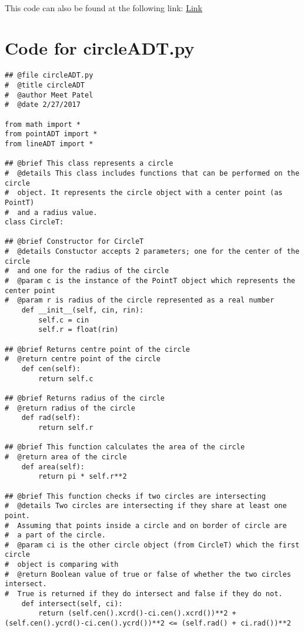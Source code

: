 \documentclass[12pt]{article}
\begin{document}
~\newline

\noindent This code can also be found at the following link:
\href{https://gitlab.cas.mcmaster.ca/se2aa4_cs2me3_assignments/patelm16/blob/master/A2/src/lineADT.py}{Link}

\newpage

\section{Code for circleADT.py} \label{MyCircleSect}
\begin{lstlisting}
## @file circleADT.py
#  @title circleADT
#  @author Meet Patel
#  @date 2/27/2017

from math import *
from pointADT import *
from lineADT import *

## @brief This class represents a circle
#  @details This class includes functions that can be performed on the circle
#  object. It represents the circle object with a center point (as PointT)
#  and a radius value.
class CircleT:

## @brief Constructor for CircleT
#  @details Constuctor accepts 2 parameters; one for the center of the circle
#  and one for the radius of the circle
#  @param c is the instance of the PointT object which represents the center point
#  @param r is radius of the circle represented as a real number
    def __init__(self, cin, rin):
        self.c = cin
        self.r = float(rin) 
        
## @brief Returns centre point of the circle
#  @return centre point of the circle
    def cen(self):
        return self.c

## @brief Returns radius of the circle
#  @return radius of the circle
    def rad(self):
        return self.r
    
## @brief This function calculates the area of the circle
#  @return area of the circle
    def area(self):
        return pi * self.r**2

## @brief This function checks if two circles are intersecting
#  @details Two circles are intersecting if they share at least one point.
#  Assuming that points inside a circle and on border of circle are
#  a part of the circle.
#  @param ci is the other circle object (from CircleT) which the first circle
#  object is comparing with
#  @return Boolean value of true or false of whether the two circles intersect.
#  True is returned if they do intersect and false if they do not.
    def intersect(self, ci):
        return (self.cen().xcrd()-ci.cen().xcrd())**2 + (self.cen().ycrd()-ci.cen().ycrd())**2 <= (self.rad() + ci.rad())**2


\end{lstlisting}
\end{document}
